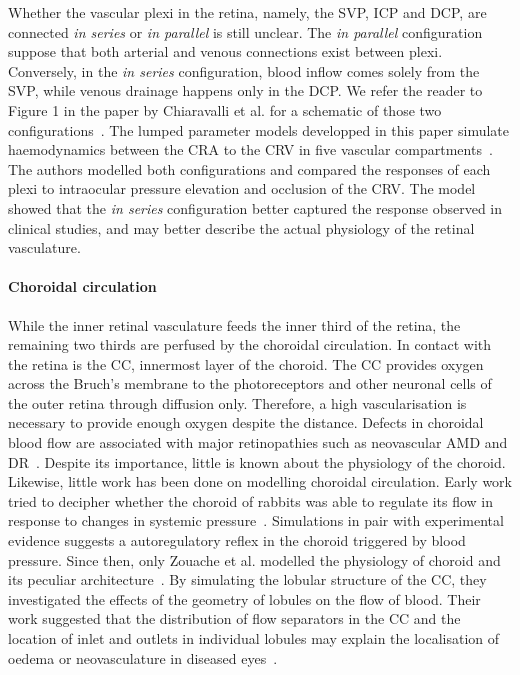 \documentclass{article}
\begin{document}
Whether the vascular plexi in the retina, namely, the SVP, ICP and DCP, are connected \textit{in series} or \textit{in parallel} is still unclear.
The \textit{in parallel} configuration suppose that both arterial and venous connections exist between plexi.
Conversely, in the \textit{in series} configuration, blood inflow comes solely from the SVP, while venous drainage happens only in the DCP.
We refer the reader to Figure 1 in the paper by Chiaravalli et al. for a schematic of those two configurations~\cite{Chiaravalli_2021}.
The lumped parameter models developped in this paper simulate haemodynamics between the CRA to the CRV in five vascular compartments~\cite{Chiaravalli_2021}.
The authors modelled both configurations and compared the responses of each plexi to intraocular pressure elevation and occlusion of the CRV.
The model showed that the \textit{in series} configuration better captured the response observed in clinical studies, and may better describe the actual physiology of the retinal vasculature.

\paragraph*{Choroidal circulation}
While the inner retinal vasculature feeds the inner third of the retina, the remaining two thirds are perfused by the choroidal circulation.
In contact with the retina is the CC, innermost layer of the choroid.
The CC provides oxygen across the Bruch's membrane to the photoreceptors and other neuronal cells of the outer retina through diffusion only.
Therefore, a high vascularisation is necessary to provide enough oxygen despite the distance.
Defects in choroidal blood flow are associated with major retinopathies such as neovascular AMD and DR~\cite{Pemp_2008}.
Despite its importance, little is known about the physiology of the choroid.
Likewise, little work has been done on modelling choroidal circulation.
Early work tried to decipher whether the choroid of rabbits was able to regulate its flow in response to changes in systemic pressure~\cite{Kiel_1992}.
Simulations in pair with experimental evidence suggests a autoregulatory reflex in the choroid triggered by blood pressure.
Since then, only Zouache et al. modelled the physiology of choroid and its peculiar architecture~\cite{Zouache_2015}.
By simulating the lobular structure of the CC, they investigated the effects of the geometry of lobules on the flow of blood.
Their work suggested that the distribution of flow separators in the CC and the location of inlet and outlets in individual lobules may explain the localisation of oedema or neovasculature in diseased eyes~\cite{Zouache_2015}.
\end{document}
